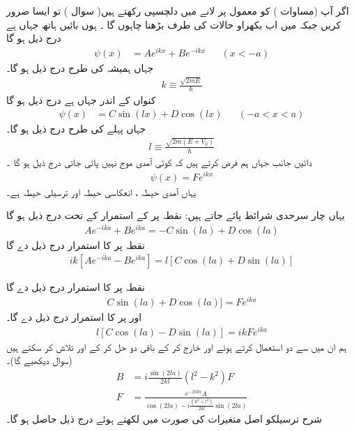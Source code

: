 اگر  آپ   (مساوات )   کو معمول پر لانے میں دلچسپی رکھتے ہیں( سوال ) تو  ایسا ضرور کریں   جبکہ  میں اب بکھراو  حالات  کی طرف  بڑھنا چاہوں گا ۔  ہوں بائیں ہاتھ جہاں ہے درج ذیل ہو گا 
\begin{align}
\psi(x)&=Ae^{i k x}+Be^{-i k x} && (x<-a) 
\end{align}
 جہاں  ہمیشہ  کی طرح درج ذیل ہو گا۔
 \begin{align}
 k\equiv \frac{\sqrt{2mE}}{\hslash} 
 \end{align} 
  کنواں کے اندر جہاں  ہے درج ذیل ہو گا
\begin{align}
\psi(x)&=C\sin(lx)+D\cos(lx)&& (-a<x<a)
 \end{align}
 جہاں پہلے کی طرح درج ذیل ہو گا۔
  \begin{align}
  l\equiv \frac{\sqrt{2m(E+V_{0})}}{\hslash}
   \end{align}
     دائیں جانب جہاں ہم فرض کرتے ہیں کہ کوئی آمدی  موج نہیں پائی جاتی  درج ذیل ہو گا ۔
 \begin{align}
 \psi(x)=Fe^{i k x} 
 \end{align}
  یہاں  آمدی حیطہ ،  انعکاسی  حیطہ    اور ترسیلی  حیطہ    ہے۔ 
  
   یہاں چار سرحدی شرائط پائے جاتے ہیں:  نقطہ    پر    کے  استمرار   کے تحت  درج ذیل ہو گا
\begin{align}\label{مساوات_شروڈنگر_اے}
Ae^{-ika}+Be^{ika} = -C\sin(la)+D\cos(la)
 \end{align}
نقطہ  پر کا استمرار درج ذیل دے گا
\begin{align}\label{مساوات_شروڈنگر_اے_بی}
ik[Ae^{-ika}-Be^{ika}] =l[C\cos(la)+D\sin(la)] 
\end{align}

نقطہ  پر کا استمرار درج ذیل دے گا 
\begin{align}\label{مساوات_شروڈنگر_سی}
C\sin (la)+D\cos(la)]=Fe^{ika} 
\end{align}
اور  پر  کا استمرار درج ذیل  دے گا۔
\begin{align}\label{مساوات_شروڈنگر_ڈی}
l[C\cos(la)-D\sin(la)]=ikFe^{ika} 
\end{align}
 ہم ان میں سے دو  استعمال کرتے ہوئے     اور   خارج کر کے باقی دو  حل کر کے   اور  تلاش کر سکتے ہیں (سوال دیکھیے گا)۔
\begin{align}
B&=i\frac{\sin(2la)}{2kl}(l^{2}-k^{2})F \label{مساوات_شروڈنگر_بی}\\
F&=\frac{e^{-2ika}A}{\cos(2la)-i\frac{(k^{2}+l^{2})}{2kl}\sin(2la)}\label{مساوات_شروڈنگر_ایف}
\end{align}
  شرح ترسیلکو   اصل متغیرات کی صورت    میں لکھتے ہوئے  درج ذیل  حاصل ہو گا۔

